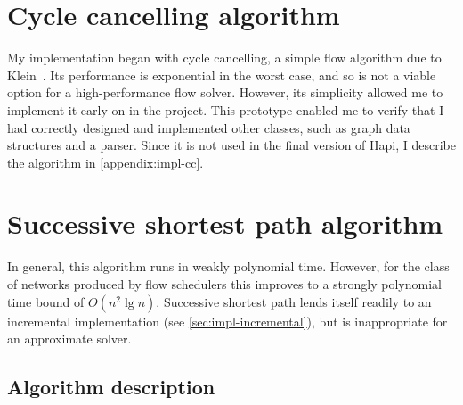 \section{Cycle cancelling algorithm} \label{sec:impl-cycle-cancelling}


My implementation began with cycle cancelling, a simple flow algorithm due to Klein~\cite{Klein:1967}. Its performance is exponential in the worst case, and so is not a viable option for a high-performance flow solver. However, its simplicity allowed me to implement it early on in the project. This prototype enabled me to verify that I had correctly designed and implemented other classes, such as graph data structures and a parser. Since it is not used in the final version of Hapi, I describe the algorithm in \cref{appendix:impl-cc}.

\section{Successive shortest path algorithm} \label{sec:impl-ssp}


In general, this algorithm runs in weakly polynomial time. However, for the class of networks produced by flow schedulers this improves to a strongly polynomial time bound of $O(n^2 \lg n)$. Successive shortest path lends itself readily to an incremental implementation (see \cref{sec:impl-incremental}), but is inappropriate for an approximate solver.

\newpage

\subsection{Algorithm description}

